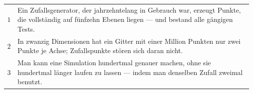 \begin{merksatz}
\begin{center}
{\small
\renewcommand{\arraystretch}{1.55}
\begin{tabular}{@{}P{1.0cm}P{7.4cm}@{}}
\toprule
$1$ & Ein Zufallsgenerator, der jahrzehntelang in Gebrauch war, erzeugt Punkte, die vollständig auf fünfzehn Ebenen liegen --- und bestand alle gängigen Tests. \\
$2$ & In zwanzig Dimensionen hat ein Gitter mit einer Million Punkten nur zwei Punkte je Achse; Zufallspunkte stören sich daran nicht. \\
$3$ & Man kann eine Simulation hundertmal genauer machen, ohne sie hundertmal länger laufen zu lassen --- indem man denselben Zufall zweimal benutzt. \\
\bottomrule
\end{tabular}}
\end{center}

\begin{center}
\begin{minipage}{0.88\textwidth}
\end{minipage}
\end{center}
\end{merksatz}

